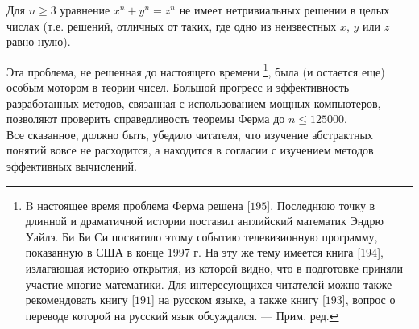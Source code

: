 \documentclass{mai_book}
\begin{document}
\begin{thm}
Для $n \ge 3$ уравнение $x^n + y^n = z^n$ не имеет нетривиальных 
решении в целых числах (т.е. решений, отличных от таких, где одно из
неизвестных $x$, $y$ или $z$ равно нулю).
\end{thm}

Эта проблема, не решенная до настоящего времени \footnote{B настоящее время проблема Ферма решена [$195$]. Последнюю точку в длинной
и драматичной истории поставил английский математик Эндрю Уайлэ. Би Би Си
посвятило этому событию телевизионную программу, показанную в США в конце
$1997$ г. На эту же тему имеется книга [$194$], излагающая историю открытия, из которой видно, что в подготовке приняли участие многие математики. Для 
интересующихся читателей можно также рекомендовать книгу [$191$] на русском языке, а также книгу [$193$], вопрос о переводе которой на русский язык обсуждался. — Прим. ред.}, была (и 
остается еще) особым мотором в теории чисел. Большой прогресс и 
эффективность разработанных методов, связанная с использованием мощных
компьютеров, позволяют проверить справедливость теоремы Ферма до
$n \le 125000$.
\\

Все сказанное, должно быть, убедило читателя, что изучение
абстрактных понятий вовсе не расходится, а находится в согласии с
изучением методов эффективных вычислений.
\\

\newpage
\end{document}
